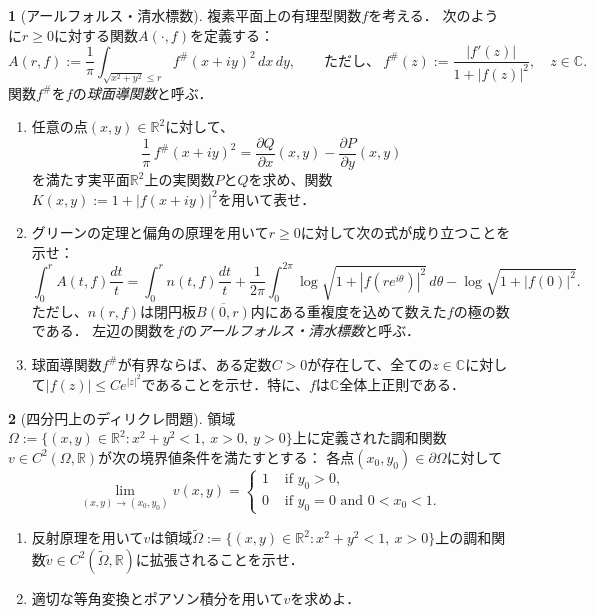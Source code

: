 \documentclass[a4paper]{article}
\theoremstyle{definition}
\newtheorem{prb}{}
\newcommand{\C}{\mathbb{C}}
\newcommand{\R}{\mathbb{R}}
\renewcommand{\tilde}{\widetilde}
\renewcommand{\bar}{\overline}
\begin{document}
\begin{prb}[アールフォルス・清水標数]
複素平面上の有理型関数$f$を考える．
次のように$r\ge0$に対する関数$A(\cdot,f)$を定義する：
\[A(r,f):=\frac1\pi\int_{\sqrt{x^2+y^2}\le r}f^\#(x+iy)^2\,dx\,dy,\qquad\text{ただし、}\ f^\#(z):=\frac{|f'(z)|}{1+|f(z)|^2},\quad z\in\C.\]
関数$f^\#$を$f$の\emph{球面導関数}と呼ぶ．
\begin{enumerate}[label=(\arabic*)]
\item 任意の点$(x,y)\in\R^2$に対して、
\[\frac1\pi\,f^\#(x+iy)^2=\frac{\partial Q}{\partial x}(x,y)-\frac{\partial P}{\partial y}(x,y)\]
を満たす実平面$\R^2$上の実関数$P$と$Q$を求め、関数$K(x,y):=1+|f(x+iy)|^2$を用いて表せ．
\item グリーンの定理と偏角の原理を用いて$r\ge0$に対して次の式が成り立つことを示せ：
\[\int_0^rA(t,f)\frac{dt}t=\int_0^rn(t,f)\frac{dt}t+\frac1{2\pi}\int_0^{2\pi}\log\sqrt{1+|f(re^{i\theta})|^2}\,d\theta-\log\sqrt{1+|f(0)|^2}.\]
ただし、$n(r,f)$は閉円板$\bar{B(0,r)}$内にある重複度を込めて数えた$f$の極の数である．
左辺の関数を$f$の\emph{アールフォルス・清水標数}と呼ぶ．
\item 球面導関数$f^\#$が有界ならば、ある定数$C>0$が存在して、全ての$z\in\C$に対して$|f(z)|\le Ce^{|z|^2}$であることを示せ．特に、$f$は$\C$全体上正則である．
\end{enumerate}
\end{prb}

\begin{prb}[四分円上のディリクレ問題]
領域$\Omega:=\{(x,y)\in\R^2:x^2+y^2<1,\ x>0,\ y>0\}$上に定義された調和関数$v\in C^2(\Omega,\R)$が次の境界値条件を満たすとする：
各点$(x_0,y_0)\in\partial\Omega$に対して
\[\lim_{(x,y)\to(x_0,y_0)}v(x,y)=\begin{cases}
1&\text{ if }y_0>0,\\
0&\text{ if }y_0=0\text{ and }0<x_0<1.
\end{cases}\]
\begin{enumerate}[label=(\arabic*)]
\item 反射原理を用いて$v$は領域$\tilde\Omega:=\{(x,y)\in\R^2:x^2+y^2<1,\ x>0\}$上の調和関数$\tilde v\in C^2(\tilde\Omega,\R)$に拡張されることを示せ．
\item 適切な等角変換とポアソン積分を用いて$v$を求めよ．
\end{enumerate}
\end{prb}


\newpage
\end{document}
